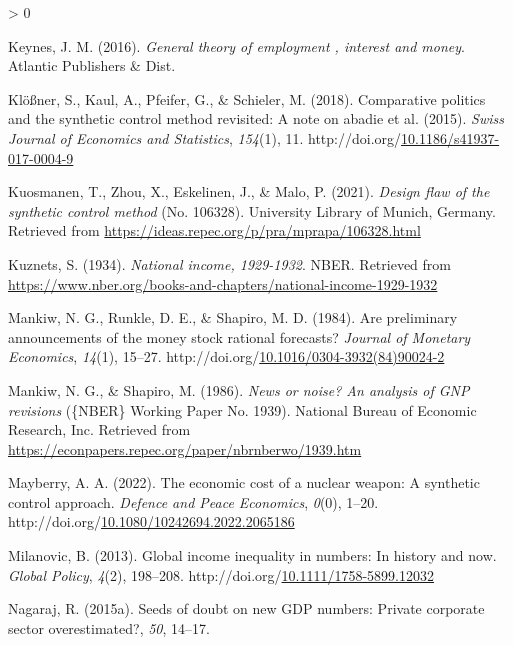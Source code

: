 \documentclass[12pt,nobind, a4paper]{reedthesis}
\newlength{\cslhangindent}
\newenvironment{CSLReferences}[2] %
{%
	\setlength{\parindent}{0pt}
	\ifodd #1 \everypar{\setlength{\hangindent}{\cslhangindent}}\ignorespaces\fi
	\ifnum #2 > 0
	\setlength{\parskip}{#2\baselineskip}
	\fi
}%
{}
\begin{document}
\begin{CSLReferences}{1}{0}
 \leavevmode\hypertarget{ref-keynes_general_2016}{}%
 Keynes, J. M. (2016). \emph{General theory of employment , interest and money}. Atlantic Publishers \& Dist.

 \leavevmode\hypertarget{ref-klosner_comparative_2018}{}%
 Klößner, S., Kaul, A., Pfeifer, G., \& Schieler, M. (2018). Comparative politics and the synthetic control method revisited: A note on abadie et al. (2015). \emph{Swiss Journal of Economics and Statistics}, \emph{154}(1), 11. http://doi.org/\href{https://doi.org/10.1186/s41937-017-0004-9}{10.1186/s41937-017-0004-9}

 \leavevmode\hypertarget{ref-kuosmanen_design_2021}{}%
 Kuosmanen, T., Zhou, X., Eskelinen, J., \& Malo, P. (2021). \emph{Design flaw of the synthetic control method} (No. 106328). University Library of Munich, Germany. Retrieved from \url{https://ideas.repec.org/p/pra/mprapa/106328.html}

 \leavevmode\hypertarget{ref-kuznets_national_1934}{}%
 Kuznets, S. (1934). \emph{National income, 1929-1932}. {NBER}. Retrieved from \url{https://www.nber.org/books-and-chapters/national-income-1929-1932}

 \leavevmode\hypertarget{ref-mankiw_are_1984}{}%
 Mankiw, N. G., Runkle, D. E., \& Shapiro, M. D. (1984). Are preliminary announcements of the money stock rational forecasts? \emph{Journal of Monetary Economics}, \emph{14}(1), 15--27. http://doi.org/\href{https://doi.org/10.1016/0304-3932(84)90024-2}{10.1016/0304-3932(84)90024-2}

 \leavevmode\hypertarget{ref-mankiw_news_1986}{}%
 Mankiw, N. G., \& Shapiro, M. (1986). \emph{News or noise? An analysis of {GNP} revisions} (\{NBER\} Working Paper No. 1939). National Bureau of Economic Research, Inc. Retrieved from \url{https://econpapers.repec.org/paper/nbrnberwo/1939.htm}

 \leavevmode\hypertarget{ref-mayberry_economic_2022}{}%
 Mayberry, A. A. (2022). The economic cost of a nuclear weapon: A synthetic control approach. \emph{Defence and Peace Economics}, \emph{0}(0), 1--20. http://doi.org/\href{https://doi.org/10.1080/10242694.2022.2065186}{10.1080/10242694.2022.2065186}

 \leavevmode\hypertarget{ref-milanovic_global_2013}{}%
 Milanovic, B. (2013). Global income inequality in numbers: In history and now. \emph{Global Policy}, \emph{4}(2), 198--208. http://doi.org/\href{https://doi.org/10.1111/1758-5899.12032}{10.1111/1758-5899.12032}

 \leavevmode\hypertarget{ref-nagaraj_seeds_2015-1}{}%
 Nagaraj, R. (2015a). Seeds of doubt on new {GDP} numbers: Private corporate sector overestimated?, \emph{50}, 14--17.


\end{CSLReferences}
\end{document}
